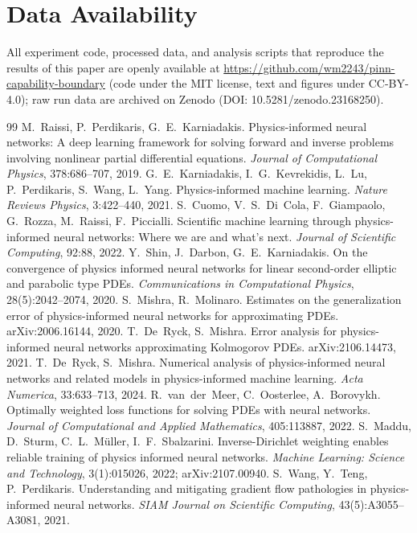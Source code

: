\documentclass[11pt]{article}
\numberwithin{equation}{section}
\begin{document}
\section*{Data Availability}
All experiment code, processed data, and analysis scripts that reproduce the results of this paper are openly available at \url{https://github.com/wm2243/pinn-capability-boundary} (code under the MIT license, text and figures under CC-BY-4.0); raw run data are archived on Zenodo (DOI: 10.5281/zenodo.23168250).

\begin{thebibliography}{99}\small
{} M.~Raissi, P.~Perdikaris, G.~E.~Karniadakis. Physics-informed neural networks: A deep learning framework for solving forward and inverse problems involving nonlinear partial differential equations. \emph{Journal of Computational Physics}, 378:686--707, 2019.
 G.~E.~Karniadakis, I.~G.~Kevrekidis, L.~Lu, P.~Perdikaris, S.~Wang, L.~Yang. Physics-informed machine learning. \emph{Nature Reviews Physics}, 3:422--440, 2021.
 S.~Cuomo, V.~S.~Di~Cola, F.~Giampaolo, G.~Rozza, M.~Raissi, F.~Piccialli. Scientific machine learning through physics-informed neural networks: Where we are and what's next. \emph{Journal of Scientific Computing}, 92:88, 2022.
 Y.~Shin, J.~Darbon, G.~E.~Karniadakis. On the convergence of physics informed neural networks for linear second-order elliptic and parabolic type PDEs. \emph{Communications in Computational Physics}, 28(5):2042--2074, 2020.
 S.~Mishra, R.~Molinaro. Estimates on the generalization error of physics-informed neural networks for approximating PDEs. arXiv:2006.16144, 2020.
 T.~De~Ryck, S.~Mishra. Error analysis for physics-informed neural networks approximating Kolmogorov PDEs. arXiv:2106.14473, 2021.
 T.~De~Ryck, S.~Mishra. Numerical analysis of physics-informed neural networks and related models in physics-informed machine learning. \emph{Acta Numerica}, 33:633--713, 2024.
 R.~van~der~Meer, C.~Oosterlee, A.~Borovykh. Optimally weighted loss functions for solving PDEs with neural networks. \emph{Journal of Computational and Applied Mathematics}, 405:113887, 2022.
 S.~Maddu, D.~Sturm, C.~L.~M\"uller, I.~F.~Sbalzarini. Inverse-Dirichlet weighting enables reliable training of physics informed neural networks. \emph{Machine Learning: Science and Technology}, 3(1):015026, 2022; arXiv:2107.00940.
 S.~Wang, Y.~Teng, P.~Perdikaris. Understanding and mitigating gradient flow pathologies in physics-informed neural networks. \emph{SIAM Journal on Scientific Computing}, 43(5):A3055--A3081, 2021.

\end{thebibliography}
\end{document}
